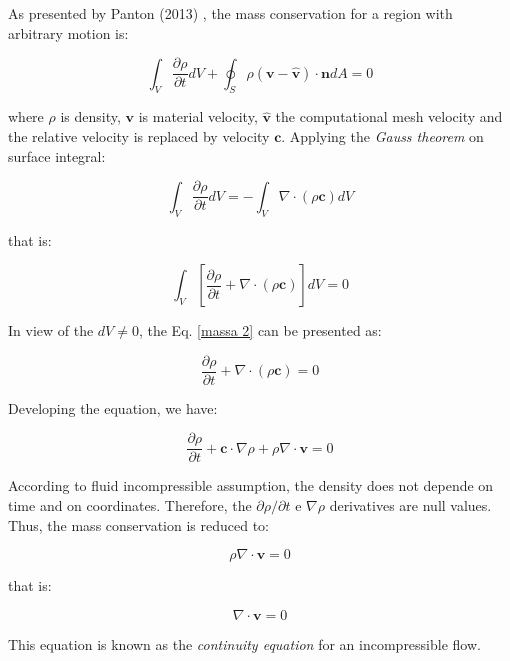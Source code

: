 As presented by Panton (2013) \cite{panton2013},
the mass conservation for a region with arbitrary motion is:

\begin{equation} \label{mass arbitrary domain panton}
 \int_{V} \frac{\partial \rho}{\partial t} dV
 + 
 \oint_{S} \rho 
 \left( \textbf{v} - \hat{\textbf{v}} \right) 
 \cdot \textbf{n} dA
 = 0
\end{equation}

\medskip
\noindent 
where $\rho$ is density, 
$\textbf{v}$ is material velocity,
$\hat{\textbf{v}}$ the computational mesh velocity and
the relative velocity
is replaced by velocity $\textbf{c}$.
Applying the \textit{Gauss theorem} on surface integral:

\begin{equation}
 \int_{V} \frac{\partial \rho}{\partial t} dV
 = - 
 \int_{V} \nabla \cdot \left( \rho \textbf{c} \right) dV
\end{equation}

\medskip
\noindent
that is:

\begin{equation} \label{massa 2}
 \int_{V} \left[ \frac{\partial \rho}{\partial t}
 + 
 \nabla \cdot 
\left( \rho \textbf{c} \right) 
\right] dV 
 = 0 
\end{equation}

\medskip
\noindent 
In view of the $dV \neq 0$,
the Eq. \ref{massa 2} can be presented as:

\begin{equation} \label{continuity equation}
 \frac{\partial \rho}{\partial t}
 + 
 \nabla \cdot 
\left( \rho \textbf{c} \right) 
 = 0 
\end{equation}

\medskip
\noindent
Developing the equation, we have:

\begin{equation}
 \frac{\partial \rho}{\partial t}
 +
 \textbf{c} \cdot \nabla \rho
 +
 \rho \nabla \cdot \textbf{v}
 = 0
\end{equation}

\medskip
According to fluid incompressible assumption,
the density does not depende on time and on coordinates.
Therefore, the 
$\partial \rho / \partial t$ e $\nabla \rho$ derivatives are 
null values.
Thus, the mass conservation is reduced to:

\begin{equation} \label{massa 3}
 \rho \nabla \cdot \textbf{v}
 = 0 
\end{equation}

\medskip
\noindent that is:

\begin{equation} \label{incompressible continuity equation}
 \nabla \cdot \textbf{v}
 = 0 
\end{equation}

\medskip
\noindent 
This equation is known as the \textit{continuity equation} 
for an incompressible flow.




